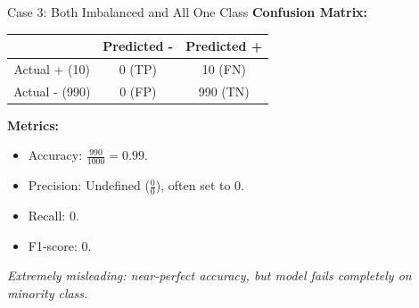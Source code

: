 \documentclass{beamer}
\begin{document}
\begin{frame}{Case 3: Both Imbalanced and All One Class}
  \textbf{Confusion Matrix:}
  \begin{table}[h]
    \centering
    \begin{tabular}{|c|c|c|}
      \hline
      & Predicted - & Predicted + \\
      \hline
      Actual + (10) & 0 (TP) & 10 (FN) \\
      \hline
      Actual - (990) & 0 (FP) & 990 (TN) \\
      \hline
    \end{tabular}
  \end{table}
  \textbf{Metrics:}
  \begin{itemize}
    \item Accuracy: \( \frac{990}{1000} = 0.99 \).
    \item Precision: Undefined (\( \frac{0}{0} \)), often set to 0.
    \item Recall: \( 0 \).
    \item F1-score: \( 0 \).
  \end{itemize}
  \textit{\small{Extremely misleading: near-perfect accuracy, but model fails completely on minority class.}}
\end{frame}
\end{document}
